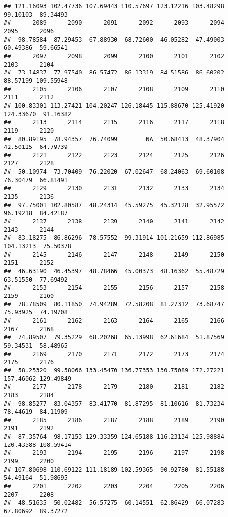 \documentclass[
]{article}
\begin{document}
\begin{verbatim}
## 121.16093 102.47736 107.69443 110.57697 123.12216 103.48298  99.10103  89.34493 
##      2089      2090      2091      2092      2093      2094      2095      2096 
##  98.78584  87.29453  67.88930  68.72600  46.05282  47.49003  60.49386  59.66541 
##      2097      2098      2099      2100      2101      2102      2103      2104 
##  73.14837  77.97540  86.57472  86.13319  84.51586  86.60202  88.57199 109.55948 
##      2105      2106      2107      2108      2109      2110      2111      2112 
## 100.83301 113.27421 104.20247 126.18445 115.88670 125.41920 124.33670  91.16382 
##      2113      2114      2115      2116      2117      2118      2119      2120 
##  80.89195  78.94357  76.74099        NA  50.68413  48.37904  42.50125  64.79739 
##      2121      2122      2123      2124      2125      2126      2127      2128 
##  50.10974  73.70409  76.22020  67.02647  68.24063  69.60108  76.30479  66.81491 
##      2129      2130      2131      2132      2133      2134      2135      2136 
##  97.75001 102.80587  48.24314  45.59275  45.32128  32.95572  96.19218  84.42187 
##      2137      2138      2139      2140      2141      2142      2143      2144 
##  83.18275  86.86296  78.57552  99.31914 101.21659 112.86985 104.13213  75.50378 
##      2145      2146      2147      2148      2149      2150      2151      2152 
##  46.63190  46.45397  48.78466  45.00373  48.16362  55.48729  63.51550  77.69492 
##      2153      2154      2155      2156      2157      2158      2159      2160 
##  78.78509  80.11850  74.94289  72.58208  81.27312  73.68747  75.93925  74.19708 
##      2161      2162      2163      2164      2165      2166      2167      2168 
##  74.89507  79.35229  68.20268  65.13998  62.61684  51.87569  59.34531  58.48965 
##      2169      2170      2171      2172      2173      2174      2175      2176 
##  58.25320  99.58066 133.45470 136.77353 130.75089 172.27221 157.46062 129.49849 
##      2177      2178      2179      2180      2181      2182      2183      2184 
##  98.85277  83.04357  83.41770  81.87295  81.10616  81.73234  78.44619  84.11909 
##      2185      2186      2187      2188      2189      2190      2191      2192 
##  87.35764  98.17153 129.33359 124.65188 116.23134 125.98884 120.43588 108.59414 
##      2193      2194      2195      2196      2197      2198      2199      2200 
## 107.80698 110.69122 111.18189 102.59365  90.92780  81.55188  54.49164  51.98695 
##      2201      2202      2203      2204      2205      2206      2207      2208 
##  48.51635  50.02482  56.57275  60.14551  62.86429  66.07283  67.80692  89.37272 

\end{verbatim}
\end{document}
